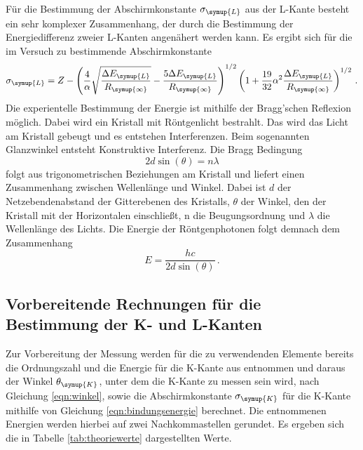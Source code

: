 Für die Bestimmung der Abschirmkonstante $\sigma_{\symup{L}}$ aus der L-Kante besteht ein
sehr komplexer Zusammenhang, der durch die Bestimmung der Energiedifferenz zweier
L-Kanten angenähert werden kann. Es ergibt sich für die im Versuch zu bestimmende
Abschirmkonstante
\begin{equation}
  \sigma_{\symup{L}}=Z-\left(\frac{4}{\alpha} \sqrt{\frac{\Delta E_{\symup{L}}}{R_{\symup{\infty}}}}
  -\frac{5\Delta E_{\symup{L}}}{R_{\symup{\infty}}}\right)^{1/2}
  \left(1+\frac{19}{32}\alpha^2 \frac{\Delta E_{\symup{L}}}{R_{\symup{\infty}}}\right)^{1/2} \,.
  \label{eqn:naeherung}
\end{equation}
Die experientelle Bestimmung der Energie ist mithilfe der Bragg'schen Reflexion
möglich. Dabei wird ein Kristall mit Röntgenlicht bestrahlt. Das wird das Licht
am Kristall gebeugt und es entstehen Interferenzen. Beim sogenannten Glanzwinkel
entsteht Konstruktive Interferenz. Die Bragg Bedingung
\begin{equation}
  2 d \sin(\theta)= n \lambda
  \label{eqn:bragg}
\end{equation}
folgt aus trigonometrischen Beziehungen am Kristall und liefert einen Zusammenhang
zwischen Wellenlänge und Winkel. Dabei ist $d$ der Netzebendenabstand der Gitterebenen
des Kristalls, $\theta$ der Winkel, den der Kristall mit der Horizontalen einschließt,
n die Beugungsordnung und $\lambda$ die Wellenlänge des Lichts.  Die Energie der
Röntgenphotonen folgt demnach dem Zusammenhang
\begin{equation}
  E=\frac{h c}{2 d \sin(\theta)} \,.
  \label{eqn:winkel}
\end{equation}


\subsection{Vorbereitende Rechnungen für die Bestimmung der K- und L-Kanten}
\label{subsec:K_L_Kanten}

Zur Vorbereitung der Messung werden für die zu verwendenden Elemente bereits
die Ordnungszahl und die Energie für die K-Kante aus \cite{xraydata} entnommen und
daraus der Winkel $\theta_{\symup{K}}$, unter dem die K-Kante zu messen sein wird,
nach Gleichung \eqref{eqn:winkel}, sowie die Abschirmkonstante $\sigma_{\symup{K}}$
für die K-Kante mithilfe von Gleichung \eqref{eqn:bindungsenergie} berechnet.
Die entnommenen Energien werden hierbei auf zwei Nachkommastellen gerundet.
Es ergeben sich die in Tabelle \ref{tab:theoriewerte} dargestellten Werte.

